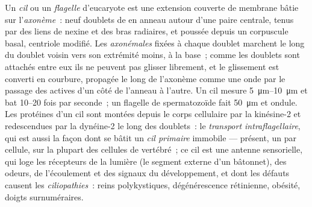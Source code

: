 \begin{definition}\label{def:b3:cytoskeleton-motility:cilia}
Un \emph{cil} ou un \emph{flagelle} d'eucaryote est une extension
couverte de membrane bâtie sur l'\emph{axonème}~: neuf doublets de
 en anneau autour d'une paire centrale, tenus par des liens
de nexine et des bras radiaires, et poussée depuis un corpuscule basal,
centriole modifié. Les \emph{ axonémales} fixées à chaque
doublet marchent le long du doublet voisin vers son extrémité moins, à
la base~; comme les doublets sont attachés entre eux ils ne peuvent pas
glisser librement, et le glissement est converti en courbure, propagée
le long de l'axonème comme une onde par le passage des  actives
d'un côté de l'anneau à l'autre. Un cil mesure
\qtyrange{5}{10}{\micro m} et bat \numrange{10}{20} fois par seconde~;
un flagelle de spermatozoïde fait \qty{50}{\micro m} et ondule. Les
protéines d'un cil sont montées depuis le corps cellulaire par la
kinésine-2 et redescendues par la dynéine-2 le long des doublets~: le
\emph{transport intraflagellaire}, qui est aussi la façon dont se bâtit
un \emph{cil primaire} immobile --- présent, un par cellule, sur la
plupart des cellules de vertébré~; ce cil est une antenne sensorielle,
qui loge les récepteurs de la lumière (le segment externe d'un
bâtonnet), des odeurs, de l'écoulement et des signaux du
développement, et dont les défauts causent les \emph{ciliopathies}~:
reins polykystiques, dégénérescence rétinienne, obésité, doigts
surnuméraires.
\end{definition}

